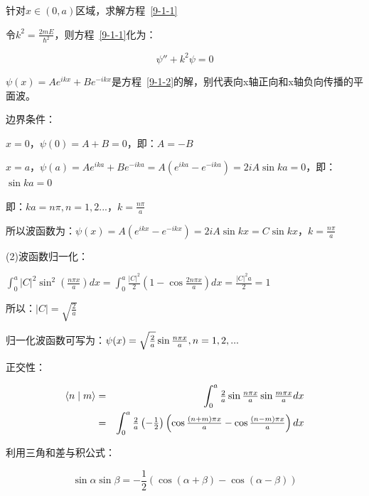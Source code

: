 针对$x \in \left( {0,a} \right)$区域，求解方程~\ref{9-1-1}


令$k^2  = \frac{{2mE}}{{\hbar ^2 }}$，则方程~\ref{9-1-1}化为：


\begin{equation}\label{9-1-2}
\psi '' + k^2 \psi  = 0
\end{equation}

$\psi (x) = Ae^{ikx}  + Be^{ - ikx} $是方程~\ref{9-1-2}的解，别代表向x轴正向和x轴负向传播的平面波。

边界条件：

$x=0$，$\psi (0) = A + B = 0$，即：$A=-B$


$x=a$，$\psi (a) = Ae^{ika}  + Be^{ - ika}  = A(e^{ika}  - e^{ - ika} ) = 2iA\sin ka = 0$，即：$\sin ka = 0$


即：$ka = n\pi ,n = 1,2...$，$k = \frac{{n\pi }}{a}$


所以波函数为：$\psi (x) = A\left( {e^{ikx}  - e^{ - ikx} } \right) = 2iA\sin kx = C\sin kx$，$k = \frac{{n\pi }}{a}$


(2)波函数归一化：

$\int_0^a {\left| C \right|^2 \sin ^2 \left( {\frac{{n\pi x}}{a}} \right)} dx = \int_0^a {\frac{{\left| C \right|^2 }}{2}\left( {1 - \cos \frac{{2n\pi x}}{a}} \right)} dx = \frac{{\left| C \right|^2 a}}{2} = 1$

所以：$\left| C \right| = \sqrt {\frac{2}{a}} $


归一化波函数可写为：$\psi (x) = \sqrt {{\textstyle{2 \over a}}} \sin {\textstyle{{n\pi x} \over a}},n = 1,2,...$


正交性：

\begin{eqnarray*}
\left\langle {n}
 \mathrel{\left | {\vphantom {n m}}
 \right. \kern-\nulldelimiterspace}
 {m} \right\rangle & = & \int_0^a {{\textstyle{2 \over a}}\sin {\textstyle{{n\pi x} \over a}}\sin {\textstyle{{m\pi x} \over a}}dx} \\
{} & = & \int_0^a {{\textstyle{2 \over a}}} \left( { - {\textstyle{1 \over 2}}} \right)\left( {\cos {\textstyle{{(n + m)\pi x} \over a}} - \cos {\textstyle{{(n - m)\pi x} \over a}}} \right)dx 
\end{eqnarray*}

利用三角和差与积公式：

\begin{equation}
\sin \alpha \sin \beta  =  - \frac{1}{2}\left( {\cos \left( {\alpha  + \beta } \right) - \cos \left( {\alpha  - \beta } \right)} \right)
\end{equation}


